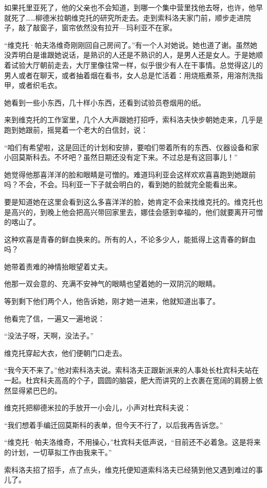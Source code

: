 如果托里亚死了，他的父亲也不会知道，到哪一个集中营里找他去呀，也许，他早就死了……柳德米拉朝维克托的研究所走去。走到索科洛夫家门前，顺步走进院子，敲了敲窗子，窗帘依然没有拉开—玛利亚不在家。

“维克托·帕夫洛维奇刚刚回自己房间了。”有一个人对她说。她也道了谢。虽然她没弄明白是谁跟她说话，是熟识的人还是不熟识的人，是男人还是女人。于是她顺着试验大厅朝前走去，大厅里像往常一样，似乎很少有人在干事情。总觉得这儿的男人或者在聊天，或者抽着烟在看书，女人总是忙活着：用烧瓶煮茶，用溶剂洗指甲，或者织毛衣。

她看到一些小东西，几十样小东西，还看到试验员卷烟用的纸。

来到维克托的工作室里，几个人大声跟她打招呼，索科洛夫快步朝她走来，几乎是跑到她跟前，摇晃着一个老大的白信封，说：

“咱们有希望啦，这是回迁的计划和安排，要咱们带着所有的东西、仪器设备和家小回莫斯科去。不坏吧？虽然日期还没有定下来。不过总是有这回事儿！”

她觉得他那喜洋洋的脸和眼睛是可憎的。难道玛利亚会这样欢欢喜喜跑到她跟前吗？不会，不会。玛利亚一下子就会明白的，看到她的脸就完全能看出来。

要是知道她在这里会看到这么多喜洋洋的脸，她肯定不会来找维克托的。维克托也是高兴的，到晚上他会把高兴带回家里去，娜佳会感到幸福的，他们就要离开可憎的喀山了。

这种欢喜是青春的鲜血换来的。所有的人，不论多少人，能抵得上这青春的鲜血吗？

她带着责难的神情抬眼望着丈夫。

他那一双会意的、充满不安神气的眼睛也望着她的一双阴沉的眼睛。

等到剩下他们两个人，他告诉她，刚才她一进来，他就知道出事了。

他看完了信，一遍又一遍地说：

“没法子呀，天啊，没法子。”

维克托穿起大衣，他们便朝门口走去。

“我今天不来了。”他对索科洛夫说。索科洛夫正跟新派来的人事处长杜宾科夫站在一起。杜宾科夫高高的个子，圆圆的脑袋，肥大而讲究的上衣裹在宽阔的肩膀上依然显得紧巴巴的。

维克托把柳德米拉的手放开一小会儿，小声对杜宾科夫说：

“我们想着手编迁回莫斯科的表单，但今天不行了，以后我再告诉您。”

“维克托·帕夫洛维奇，不用操心，”杜宾科夫低声说，“目前还不必着急。这是将来的计划，一切草拟工作由我来干。”

索科洛夫招了招手，点了点头，维克托便知道索科洛夫已经猜到他又遇到难过的事儿了。

